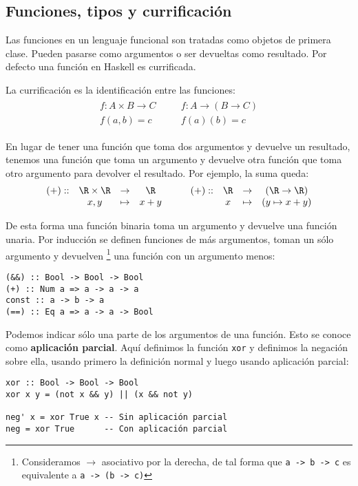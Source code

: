 \subsection {Funciones, tipos y currificación}
Las funciones en un lenguaje funcional son tratadas como objetos
de primera clase. Pueden pasarse como argumentos o ser devueltas como resultado.
Por defecto una función en Haskell es currificada.

La currificación es la identificación entre las funciones:
\begin{align*}
\begin{matrix}
f: A \times B \to C    & \quad &   f: A \to (B \to C) \\
f(a,b) = c       & \quad &     f(a)(b) =  c
\end{matrix}
\end{align*}

En lugar de tener una función que toma dos argumentos y devuelve
un resultado, tenemos una función que toma un argumento y devuelve otra
función que toma otro argumento para devolver el resultado.
Por ejemplo, la suma queda:
\begin{align*}
\begin{matrix}
(+) :: & \R \times \R & \rightarrow & \R    & \quad & (+) :: & \R & \rightarrow & (\R \rightarrow  \R) \\
       & x , y      & \mapsto     & x+y  & \quad &        & x & \mapsto     & (y  \mapsto x+y)
\end{matrix}
\end{align*}

De esta forma una función binaria toma un argumento y devuelve una función
unaria. Por inducción se definen funciones de más argumentos, toman un sólo argumento
y devuelven
\footnote{Consideramos $\rightarrow$ asociativo por la derecha, de tal forma que
\texttt{a -> b -> c} es equivalente a \texttt{a -> (b -> c)}}
una función con un argumento menos:

\begin{lstlisting}
(&&) :: Bool -> Bool -> Bool
(+) :: Num a => a -> a -> a
const :: a -> b -> a
(==) :: Eq a => a -> a -> Bool
\end{lstlisting}

Podemos indicar sólo una parte de los argumentos de una función. Esto se conoce
como \textbf{aplicación parcial}. Aquí definimos la función
\texttt{xor} y definimos la negación sobre ella, usando primero la definición
normal y luego usando aplicación parcial:

\begin{lstlisting}
xor :: Bool -> Bool -> Bool
xor x y = (not x && y) || (x && not y)

neg' x = xor True x -- Sin aplicación parcial
neg = xor True      -- Con aplicación parcial
\end{lstlisting}

